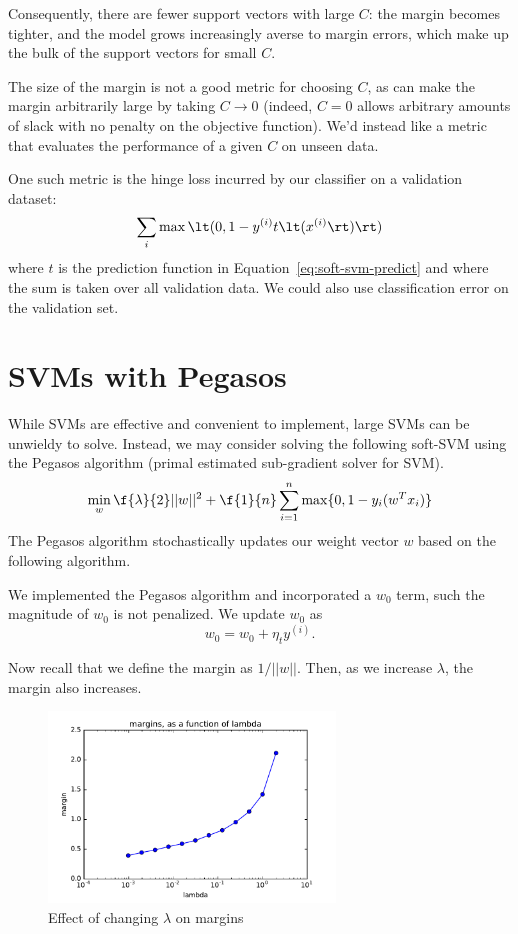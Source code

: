 \documentclass{article}
\newcommand{\sind}[1]{^{(#1)}}
\begin{document}
\begin{multicols}{2}
Consequently, there are fewer support vectors with large $C$:
the margin becomes tighter,
and the model grows increasingly averse to margin errors,
which make up the bulk of the support vectors for small $C$.

The size of the margin
is not a good metric for choosing $C$,
as can make the margin arbitrarily large
by taking $C \to 0$
(indeed, $C = 0$ allows arbitrary amounts of slack
with no penalty on the objective function).
We'd instead like a metric that evaluates
the performance of a given $C$
on unseen data.

One such metric is the hinge loss incurred
by our classifier on a validation dataset:
\begin{equation}
    \sum_{i} \max\lt(0, 1 - y\sind{i} t\lt(x\sind{i}\rt)\rt)
\end{equation}
where $t$ is the prediction function in Equation~\ref{eq:soft-svm-predict}
and where the sum is taken over all validation data.
We could also use classification error on the validation set.



\section{SVMs with Pegasos}

While SVMs are effective and convenient to implement, large SVMs can be unwieldy to solve. Instead, we may consider solving the following soft-SVM using the Pegasos algorithm (primal estimated sub-gradient solver for SVM).
\begin{equation}
   \min_w{\f{\lambda}{2}||w||^2} + \f{1}{n}\sum_{i=1}^n{\max\{0,1-y_i(w^Tx_i)\}}
\end{equation}
The Pegasos algorithm stochastically updates our weight vector $w$ based on the following algorithm.


We implemented the Pegasos algorithm and incorporated a $w_0$ term, such the magnitude of $w_0$ is not penalized. We update $w_0$ as
\begin{equation}\label{eq:pegasos-svm}
    w_0 = w_0 + \eta_t y^{(i)}.
\end{equation}

Now recall that we define the margin as $1/||w||$. Then, as we increase $\lambda$, the margin also increases.

\begin{figure}[h]
   \centering
	\includegraphics[width=3in]{img/3-2-margins.pdf}
   \caption{Effect of changing $\lambda$ on margins}
   \label{fig:3-2-margins}
\end{figure}


\end{multicols}
\end{document}
